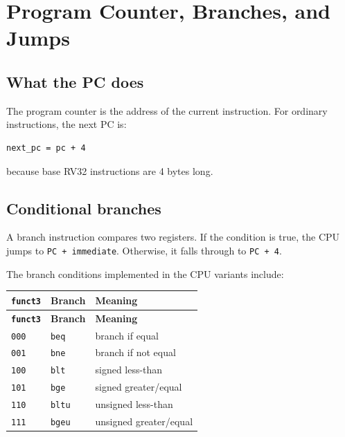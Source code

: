 \section{Program Counter, Branches, and Jumps}

\subsection{What the PC does}

The program counter is the address of the current instruction. For ordinary instructions, the next PC is:

\begin{lstlisting}[language={}]
next_pc = pc + 4
\end{lstlisting}

because base RV32 instructions are 4 bytes long.

\subsection{Conditional branches}

A branch instruction compares two registers. If the condition is true, the CPU jumps to \texttt{PC + immediate}. Otherwise, it falls through to \texttt{PC + 4}.

The branch conditions implemented in the CPU variants include:

\begin{longtable}{|>{\RaggedRight\arraybackslash}p{}|>{\RaggedRight\arraybackslash}p{}|>{\RaggedRight\arraybackslash}p{}|}
\hline
\textbf{\texttt{funct3}} & \textbf{Branch} & \textbf{Meaning} \\
\hline
\endfirsthead
\hline
\textbf{\texttt{funct3}} & \textbf{Branch} & \textbf{Meaning} \\
\hline
\endhead
\texttt{000} & \texttt{beq} & branch if equal \\
\hline
\texttt{001} & \texttt{bne} & branch if not equal \\
\hline
\texttt{100} & \texttt{blt} & signed less-than \\
\hline
\texttt{101} & \texttt{bge} & signed greater/equal \\
\hline
\texttt{110} & \texttt{bltu} & unsigned less-than \\
\hline
\texttt{111} & \texttt{bgeu} & unsigned greater/equal \\
\hline
\end{longtable}

